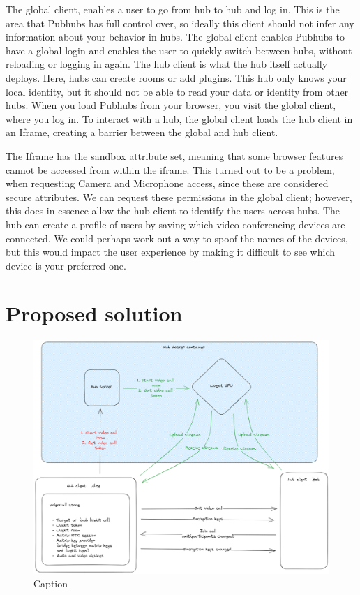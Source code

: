 \documentclass{report}
\begin{document}
    The global client, enables a user to go from hub to hub and log in. This is the area that Pubhubs has full control
    over, so ideally this client should not infer any information about your behavior in hubs. The global client enables
    Pubhubs to have a global login and enables the user to quickly switch between hubs, without reloading or logging in
    again. The hub client is what the hub itself actually deploys. Here, hubs can create rooms or add plugins. This hub
    only knows your local identity, but it should not be able to read your data or identity from other hubs. When you
    load Pubhubs from your browser, you visit the global client, where you log in. To interact with a hub, the global
    client loads the hub client in an Iframe, creating a barrier between the global and hub client.

    The Iframe has the sandbox attribute set, meaning that some browser features cannot be accessed from within the
    iframe. This turned out to be a problem, when requesting Camera and Microphone access, since these are considered
    secure attributes. We can request these permissions in the global client; however, this does in essence allow the
    hub client to identify the users across hubs. The hub can create a profile of users by saving which video
    conferencing devices are connected. We could perhaps work out a way to spoof the names of the devices, but this
    would impact the user experience by making it difficult to see which device is your preferred one.



    \chapter{Proposed solution}

    \begin{figure}
        \centering
        \includegraphics[width=\textwidth]{img/PH_videocall.excalidraw.png}
        \caption{Caption}
        \label{fig:video-conference-setup}
    \end{figure}
\end{document}
